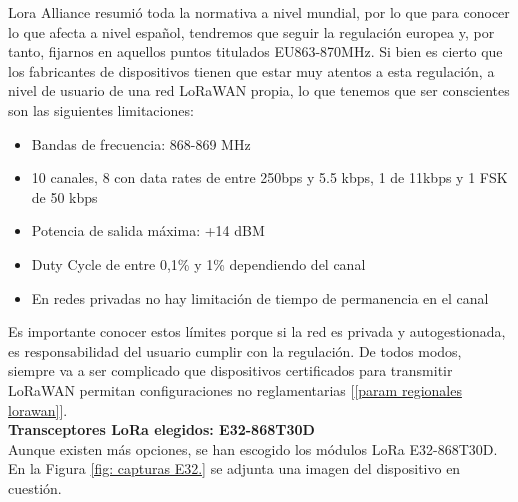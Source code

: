 \documentclass[12pt]{article}
\begin{document}
	\noindent Lora Alliance resumió toda la normativa a nivel mundial, por lo que para conocer lo que afecta a nivel español, tendremos que seguir la regulación europea y, por tanto, fijarnos en aquellos puntos titulados EU863-870MHz. Si bien es cierto que los fabricantes de dispositivos tienen que estar muy atentos a esta regulación, a nivel de usuario de una red LoRaWAN propia, lo que tenemos que ser conscientes son las siguientes limitaciones:
	
	\begin{itemize}
		\item Bandas de frecuencia: 868-869 MHz
		\item 10 canales, 8 con data rates de entre 250bps y 5.5 kbps, 1 de 11kbps y 1 FSK de 50 kbps
		\item Potencia de salida máxima: +14 dBM
		\item Duty Cycle de entre 0,1\% y 1\% dependiendo del canal
		\item En redes privadas no hay limitación de tiempo de permanencia en el canal
	\end{itemize}
	
	\noindent Es importante conocer estos límites porque si la red es privada y autogestionada, es responsabilidad del usuario cumplir con la regulación. De todos modos, siempre va a ser complicado que dispositivos certificados para transmitir LoRaWAN permitan configuraciones no reglamentarias [\ref{param regionales lorawan}].\\
	
	\noindent \textbf{Transceptores LoRa elegidos: E32-868T30D} \\
	
	\noindent Aunque existen más opciones, se han escogido los módulos LoRa E32-868T30D. En la Figura \ref{fig: capturas E32.} se adjunta una imagen del dispositivo en cuestión. \\
	
\end{document}
